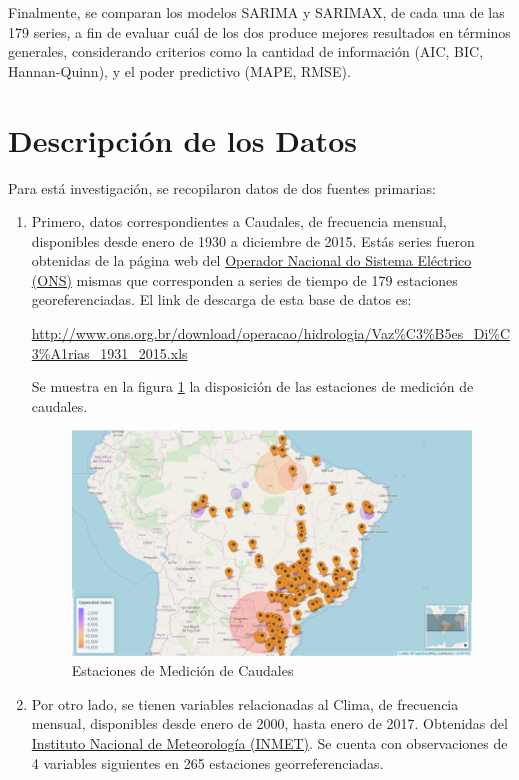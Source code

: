 \documentclass[12pt,oneside]{book}\usepackage[]{graphicx}\usepackage[]{color}
\theoremstyle{definition} %
\begin{document}
Finalmente, se comparan los modelos SARIMA y SARIMAX, de cada una de las 179 series, a fin de evaluar cuál de los dos produce mejores resultados en términos generales, considerando criterios como la cantidad de información (AIC, BIC, Hannan-Quinn), y el poder predictivo (MAPE, RMSE).


\section{Descripción de los Datos}

Para está investigación, se recopilaron datos de dos fuentes primarias:

\begin{enumerate}

\item Primero, datos correspondientes a Caudales, de frecuencia mensual, disponibles desde enero de 1930 a diciembre de 2015. Estás series fueron obtenidas de la página web del \href{http://www.ons.org.br/}{Operador Nacional do Sistema Eléctrico (ONS)} mismas que corresponden a series de tiempo de 179 estaciones georeferenciadas. El link de descarga de esta base de datos es:

\url{http://www.ons.org.br/download/operacao/hidrologia/Vaz%C3%B5es_Di%C3%A1rias_1931_2015.xls}

Se muestra en la figura \ref{fig:mapa_vaz} la disposición de las estaciones de medición de caudales.


\begin{figure}[H]
	\centering
	\includegraphics[scale=0.5]{map_estacVz}
	\caption{Estaciones de Medición de Caudales}\label{fig:mapa_vaz}
\end{figure}



\item Por otro lado, se tienen variables relacionadas al Clima, de frecuencia mensual, disponibles desde enero de 2000, hasta enero de 2017. Obtenidas del \href{http://www.inmet.gov.br/portal/}{Instituto Nacional de Meteorología (INMET)}. Se cuenta con observaciones de 4 variables siguientes en 265 estaciones georreferenciadas.


\end{enumerate}
\end{document}
